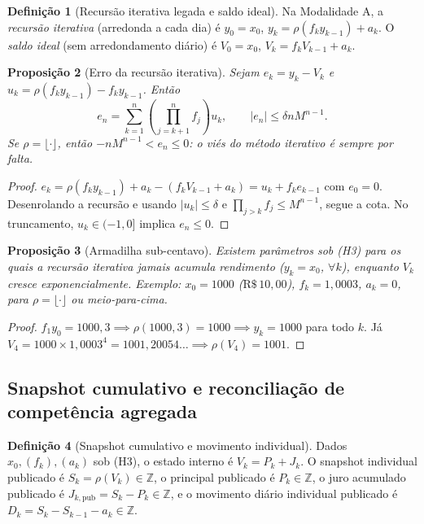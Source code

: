 \documentclass[11pt, a4paper]{article}
\theoremstyle{definition}
\newtheorem{definicao}{Definição}[section]
\theoremstyle{plain}
\newtheorem{proposicao}[definicao]{Proposição}
\theoremstyle{remark}
\begin{document}
\begin{definicao}[Recursão iterativa legada e saldo ideal]\label{def:5.4}
Na Modalidade A, a \emph{recursão iterativa} (arredonda a cada dia) é $y_0 = x_0$, $y_k = \rho(f_k y_{k-1}) + a_k$. O \emph{saldo ideal} (sem arredondamento diário) é $V_0 = x_0$, $V_k = f_k V_{k-1} + a_k$.
\end{definicao}

\begin{proposicao}[Erro da recursão iterativa]\label{prop:5.5}
Sejam $e_k = y_k - V_k$ e $u_k = \rho(f_k y_{k-1}) - f_k y_{k-1}$. Então
\[
e_n = \sum_{k=1}^{n} \left(\prod_{j=k+1}^{n} f_j\right) u_k, \qquad |e_n| \le \delta n M^{n-1}.
\]
Se $\rho = \lfloor \cdot \rfloor$, então $-n M^{n-1} < e_n \le 0$: o viés do método iterativo é sempre por falta.
\end{proposicao}
\begin{proof}
$e_k = \rho(f_k y_{k-1}) + a_k - (f_k V_{k-1} + a_k) = u_k + f_k e_{k-1}$ com $e_0 = 0$. Desenrolando a recursão e usando $|u_k| \le \delta$ e $\prod_{j>k} f_j \le M^{n-1}$, segue a cota. No truncamento, $u_k \in (-1, 0]$ implica $e_n \le 0$.
\end{proof}

\begin{proposicao}[Armadilha sub-centavo]\label{prop:5.6}
Existem parâmetros sob (H3) para os quais a recursão iterativa jamais acumula rendimento ($y_k = x_0$, $\forall k$), enquanto $V_k$ cresce exponencialmente. Exemplo: $x_0 = 1000$ ($\text{R\$}\,10{,}00$), $f_k = 1{,}0003$, $a_k = 0$, para $\rho = \lfloor \cdot \rfloor$ ou meio-para-cima.
\end{proposicao}
\begin{proof}
$f_1 y_0 = 1000{,}3 \implies \rho(1000{,}3) = 1000 \implies y_k = 1000$ para todo $k$. Já $V_4 = 1000 \times 1{,}0003^4 = 1001{,}20054\dots \implies \rho(V_4) = 1001$.
\end{proof}

\subsection{Snapshot cumulativo e reconciliação de competência agregada}\label{sec:5.3}

\begin{definicao}[Snapshot cumulativo e movimento individual]\label{def:5.7}
Dados $x_0, (f_k), (a_k)$ sob (H3), o estado interno é $V_k = P_k + J_k$. O snapshot individual publicado é $S_k = \rho(V_k) \in \mathbb{Z}$, o principal publicado é $P_k \in \mathbb{Z}$, o juro acumulado publicado é $J_{k,\text{pub}} = S_k - P_k \in \mathbb{Z}$, e o movimento diário individual publicado é $D_k = S_k - S_{k-1} - a_k \in \mathbb{Z}$.
\end{definicao}
\end{document}
